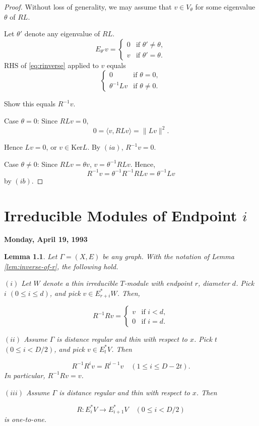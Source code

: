 \documentclass[
]{book}
\newtheorem{lemma}{Lemma}[chapter]
\theoremstyle{definition}
\theoremstyle{definition}
\theoremstyle{definition}
\theoremstyle{definition}
\theoremstyle{remark}
\begin{document}
\begin{proof}
Without loss of generality, we may assume that \(v\in V_\theta\) for some eigenvalue \(\theta\) of \(RL\).

Let \(\theta'\) denote any eigenvalue of \(RL\).
\[E_{\theta'}v = \begin{cases} 0 & \text{if } \theta'\neq \theta,\\
v & \text{if } \theta' = \theta.
\end{cases}\]
\(\mathrm{RHS}\) of \eqref{eq:rinverse} applied to \(v\) equals
\[\begin{cases} 0 & \text{if } \theta = 0,\\
\theta^{-1}Lv & \text{if } \theta \neq 0.
\end{cases}\]

Show this equals \(R^{-1}v\).

Case \(\theta = 0\):
Since \(RLv = 0\),
\[0 = \langle v, RLv\rangle = \|Lv\|^2.\]

Hence \(Lv = 0\), or \(v\in \mathrm{Ker}L\).
By \((ia)\), \(R^{-1}v = 0\).

Case \(\theta \neq 0\):
Since \(RLv = \theta v\), \(v = \theta^{-1}RLv\). Hence,
\[R^{-1}v = \theta^{-1}R^{-1}RLv = \theta^{-1}Lv\]
by \((ib)\).

\end{proof}

\hypertarget{lec32}{%
\chapter{\texorpdfstring{Irreducible Modules of Endpoint \(i\)}{Irreducible Modules of Endpoint i}}\label{lec32}}

\textbf{Monday, April 19, 1993}

\begin{lemma}
\protect\hypertarget{lem:action-of-r}{}\label{lem:action-of-r}Let \(\Gamma = (X, E)\) be any graph. With the notation of Lemma \ref{lem:inverse-of-r}, the following hold.

\((i)\) Let \(W\) denote a thin irreducible \(T\)-module with endpoint \(r\), diameter \(d\). Pick \(i\) \((0\leq i\leq d)\), and pick \(v\in E^*_{r+i}W\). Then,

\[R^{-1}R v = \begin{cases} v & \text{if } i<d,\\
0 & \text{if } i = d.
\end{cases}\]

\((ii)\) Assume \(\Gamma\) is distance regular and thin with respect to \(x\). Pick \(t\) \((0\leq i < D/2)\), and pick \(v\in E^*_tV\). Then

\[R^{-1}R^iv = R^{i-1}v\quad (1\leq i\leq D-2t).\]
In particular, \(R^{-1}R v = v\).

\((iii)\) Assume \(\Gamma\) is distance regular and thin with respect to \(x\). Then

\[R: E^*_iV \to E^*_{i+1}V \quad (0\leq i< D/2)\]
is one-to-one.
\end{lemma}
\end{document}
